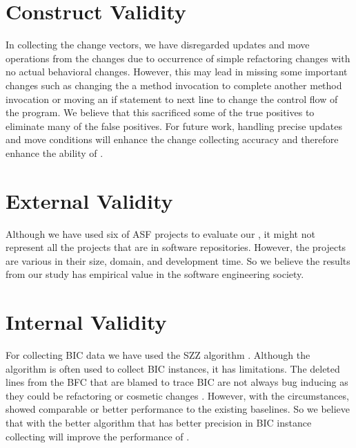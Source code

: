 \section{Construct Validity}
In collecting the change vectors, we have disregarded updates and move operations from the changes due to occurrence of simple refactoring changes with no actual behavioral changes.
However, this may lead in missing some important changes such as changing the a method invocation to complete another method invocation or moving an if statement to next line to change the control flow of the program.
We believe that this sacrificed some of the true positives to eliminate many of the false positives.
For future work, handling precise updates and move conditions will enhance the change collecting accuracy and therefore enhance the ability of {\simfinmo}.

\section{External Validity}
Although we have used six of ASF projects to evaluate our {\simfinmo}, it might not represent all the projects that are in software repositories.
However, the projects are various in their size, domain, and development time.
So we believe the results from our study has empirical value in the software engineering society.

\section{Internal Validity}
For collecting BIC data we have used the SZZ algorithm \cite{sliwerski2005changes}.
Although the algorithm is often used to collect BIC instances, it has limitations.
The deleted lines from the BFC that are blamed to trace BIC are not always bug inducing as they could be refactoring or cosmetic changes \cite{neto2018impact}.
However, with the circumstances, {\simfinmo} showed comparable or better performance to the existing baselines.
So we believe that with the better algorithm that has better precision in BIC instance collecting will improve the performance of {\simfinmo}.
